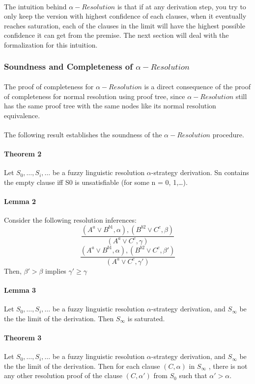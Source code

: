 \documentclass[part1.tex]{subfiles}
\begin{document}
\paragraph{} The intuition behind $\alpha-Resolution$ is that if
at any derivation step, you try to only keep the version with highest
confidence of each clauses, when it eventually reaches
saturation, each of the clauses in the limit will have the
highest possible confidence it can get from the premise. The
next section will deal with the formalization for this intuition.
\subsubsection{Soundness and Completeness of $\alpha-Resolution$}
\paragraph{} The proof of completeness for $\alpha-Resolution$ is a direct
consequence of the proof of completeness for normal resolution
using proof tree, since $\alpha-Resolution$ still has the 
same proof tree with the same nodes like its normal resolution
equivalence.

\paragraph{} The following result establishes the soundness of
the $\alpha-Resolution$ procedure.
\paragraph{Theorem 2}
Let $S_{0},\ldots,S_{i},\ldots$ be a fuzzy linguistic resolution $\alpha$-strategy derivation.
Sn contains the empty clause iff S0 is unsatisfiable (for some n = 0, 1,\ldots).
\paragraph{Lemma 2} 
Consider the following resolution inferences:
\[ \frac{(A^{a} \vee B^{b1}, \alpha), (B^{b2} \vee C^{c}, \beta)} {(A^{a} \vee C^{c}, \gamma)}\]
\[\frac{(A^{a} \vee B^{b1}, \alpha), (B^{b2} \vee C^{c}, \beta')} {(A^{a} \vee C^{c}, \gamma')}\]
Then, $\beta' > \beta$ implies $\gamma' \ge \gamma$

\paragraph{Lemma 3} Let $S_{0},\ldots,S_{i},\ldots$ be a fuzzy linguistic 
resolution $\alpha$-strategy derivation, and $S_{\infty}$ be the the limit of the derivation.
Then $S_{\infty}$ is saturated.

\paragraph{Theorem 3} Let $S_{0},\ldots,S_{i},\ldots$ be a fuzzy linguistic 
resolution $\alpha$-strategy derivation, and $S_{\infty}$ be the the limit of the derivation. 
Then for each clause $(C, \alpha)$ in $S_{\infty}$ , there is not any other resolution proof 
of the clause $(C, \alpha')$ from $S_{0}$ such that $\alpha' > \alpha$.
\end{document}
